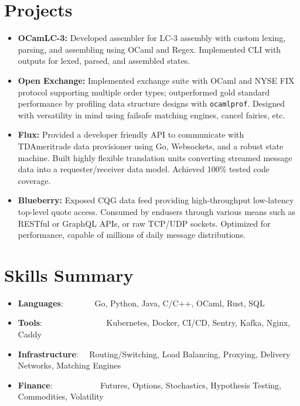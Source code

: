 \documentclass[a4paper,11pt]{extarticle}
\newcommand{\resumeSkillItem}[2]{
	\item\small{
		\textbf{#1}{: #2 \vspace{-2pt}}
	}
}
\newcommand{\resumeSubItem}[2]{\resumeSkillItem{#1}{#2}\vspace{-5pt}}
\newcommand{\resumeSubHeadingListStart}{\begin{itemize}[leftmargin=0.15in,label={}]}
\newcommand{\resumeSubHeadingListEnd}{\end{itemize}}
\begin{document}
\section{Projects}
    \noindent
    \begin{itemize}
        \vspace{-1.5mm}
        \item{\textbf{OCamLC-3:} Developed assembler for LC-3 assembly with
                custom lexing, parsing, and assembling using OCaml and Regex.
                Implemented CLI with outputs for lexed, parsed, and
                assembled states.
        }
        \vspace{-1mm}
        \item{\textbf{Open Exchange:} Implemented exchange suite with OCaml 
                and NYSE FIX protocol supporting multiple order types;
                outperformed gold standard performance by profiling data
                structure designs with \texttt{ocamlprof}. Designed with
                versatility in mind using failsafe matching engines, cancel
                fairies, etc.
        }
        \vspace{-1mm}
        \item{\textbf{Flux:} Provided a developer friendly API to communicate
                with TDAmeritrade data provisioner using Go, Websockets, and
                a robust state machine. Built highly flexible translation units
                converting streamed message data into a requester/receiver 
                data model. Achieved 100\% tested code coverage.
        }
        \vspace{-1mm}
        \item{\textbf{Blueberry:} Exposed CQG data feed providing
            high-throughput low-latency top-level quote access. Consumed
            by endusers through various means such as RESTful or GraphQL APIs,
            or raw TCP/UDP sockets. Optimized for performance, capable of
            millions of daily message distributions.
        }
    \end{itemize}

\section{Skills Summary}
	\resumeSubHeadingListStart
		\resumeSubItem{Languages}
			{\hspace{0.6mm}~~~~~~~Go, Python, Java, C/C++, OCaml, Rust, SQL}
		\resumeSubItem{Tools}
			{\hspace{0.3mm}~~~~~~~~~~~~~~~Kubernetes, Docker, CI/CD, Sentry,
				Kafka, Nginx, Caddy}
		\resumeSubItem{Infrastructure}
			{~~Routing/Switching, Load Balancing, Proxying, Delivery Networks,
			 Matching Engines}
		\resumeSubItem{Finance}
			{\hspace{0.7mm}~~~~~~~~~~~Futures, Options, Stochastics, Hypothesis
				Testing, Commodities, Volatility}
	\resumeSubHeadingListEnd
\end{document}
